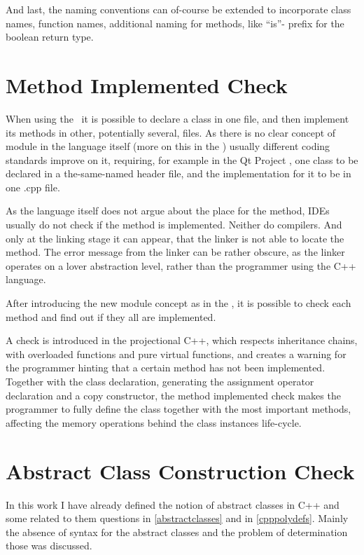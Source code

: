 And last, the naming conventions can of-course be extended to incorporate class names, function names, additional naming for methods,
like ``is''- prefix for the boolean return type. 


\section{Method Implemented Check}

When using the \cpppl\ it is possible to declare a class in one file, and then implement its methods in other, potentially
several, files. As there is no clear concept of module in the language itself (more on this in the ) usually 
different coding standards improve on it, requiring, for example in the Qt Project \cite{qtcodingguide}, one class to be 
declared in a the-same-named header file, and the implementation for it to be in one .cpp file.

As the language itself does not argue about the place for the method, IDEs usually do not check if the method is implemented.
Neither do compilers. And only at the linking stage it can appear, that the linker is not able to locate the method. The error
message from the linker can be rather obscure, as the linker operates on a lover abstraction level, rather than the programmer 
using the C++ language. 

After introducing the new module concept as in the , it is possible to check each method and find out if they all 
are implemented. 

A check is introduced in the projectional C++, which respects inheritance chains, with overloaded functions and pure virtual functions,
and creates a warning for the programmer hinting that a certain method has not been implemented. Together with the class declaration, 
generating the assignment operator declaration and a copy constructor, the method implemented check makes the programmer to 
fully define the class together with the most important methods, affecting the memory operations behind the class instances life-cycle.


\section{Abstract Class Construction Check}

In this work I have already defined the notion of abstract classes in C++ and some related to them questions in \ref{abstractclasses} and
in \ref{cpppolydefs}. Mainly the absence of syntax for the abstract classes and the problem of determination those was discussed.



